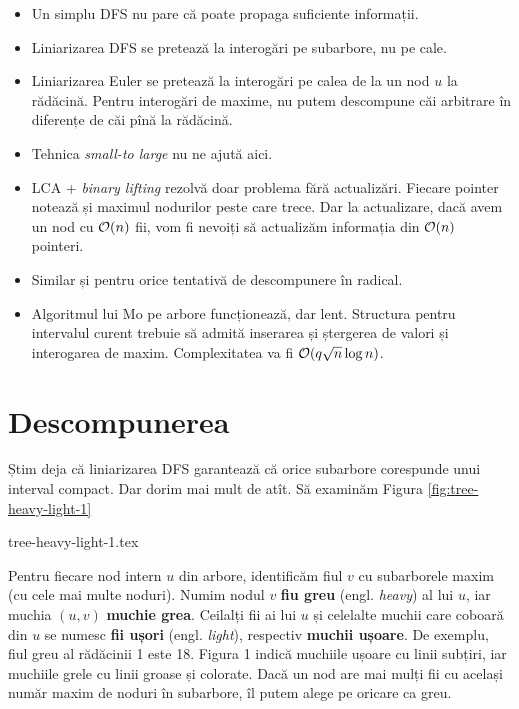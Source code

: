 \documentclass[../main.tex]{subfiles}
\begin{document}
\begin{itemize}
  \item Un simplu DFS nu pare că poate propaga suficiente informații.

  \item Liniarizarea DFS se pretează la interogări pe subarbore, nu pe cale.

  \item Liniarizarea Euler se pretează la interogări pe calea de la un nod $u$ la rădăcină. Pentru interogări de maxime, nu putem descompune căi arbitrare în diferențe de căi pînă la rădăcină.

  \item Tehnica \textit{small-to large} nu ne ajută aici.

  \item LCA + \textit{binary lifting} rezolvă doar problema fără actualizări. Fiecare pointer notează și maximul nodurilor peste care trece. Dar la actualizare, dacă avem un nod cu $\mathcal{O}(n)$ fii, vom fi nevoiți să actualizăm informația din $\mathcal{O}(n)$ pointeri.

  \item Similar și pentru orice tentativă de descompunere în radical.

  \item Algoritmul lui Mo pe arbore funcționează, dar lent. Structura pentru intervalul curent trebuie să admită inserarea și ștergerea de valori și interogarea de maxim. Complexitatea va fi $\mathcal{O}(q \sqrt{n} \log n)$.
\end{itemize}

\section{Descompunerea}

Știm deja că liniarizarea DFS garantează că orice subarbore corespunde unui interval compact. Dar dorim mai mult de atît. Să examinăm Figura \ref{fig:tree-heavy-light-1}

{tree-heavy-light-1.tex}

Pentru fiecare nod intern $u$ din arbore, identificăm fiul $v$ cu subarborele maxim (cu cele mai multe noduri). Numim nodul $v$ \textbf{fiu greu} (engl. \textit{heavy}) al lui $u$, iar muchia $(u,v)$ \textbf{muchie grea}. Ceilalți fii ai lui $u$ și celelalte muchii care coboară din $u$ se numesc \textbf{fii ușori} (engl. \textit{light}), respectiv \textbf{muchii ușoare}. De exemplu, fiul greu al rădăcinii 1 este 18. Figura 1 indică muchiile ușoare cu linii subțiri, iar muchiile grele cu linii groase și colorate. Dacă un nod are mai mulți fii cu același număr maxim de noduri în subarbore, îl putem alege pe oricare ca greu.
\end{document}
